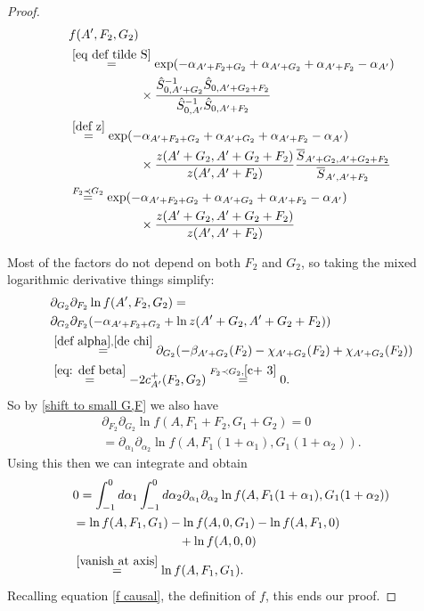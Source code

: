 \documentclass[b5paper,draft,openbib,12pt]{memoir}
\begin{document}
\begin{proof}
 \begin{align}\notag
 &f(A',F_2,G_2)\\\notag
 &\overset{\eqref{eq def tilde S}}{=}
 \exp(-\alpha_{A'+F_2+G_2}+\alpha_{A'+G_2}+\alpha_{A'+F_2}-\alpha_{A'})\\
 &\hspace{2cm}\times\frac{\hat{S}_{0,A'+G_2}^{-1}\hat{S}_{0,A'+G_2+F_2}}{\hat{S}_{0,A'}^{-1}\hat{S}_{0,A'+F_2}}
 \\\notag
 &\overset{\eqref{def z}}{=}
 \exp(-\alpha_{A'+F_2+G_2}+\alpha_{A'+G_2}+\alpha_{A'+F_2}-\alpha_{A'})\\
 &\hspace{2cm}\times \frac{z(A'+G_2,A'+G_2+F_2) }{z(A',A'+F_2)} \frac{\overline{S}_{A'+G_2,A'+G_2+F_2}}{\overline{S}_{A',A'+F_2}}\\\notag
 &\overset{F_2\prec G_2 }{=}\exp(-\alpha_{A'+F_2+G_2}+\alpha_{A'+G_2}+\alpha_{A'+F_2}-\alpha_{A'})\\
 &\hspace{2cm}\times \frac{z(A'+G_2,A'+G_2+F_2) }{z(A',A'+F_2)}
 \end{align}

Most of the factors do not depend on both \(F_2\) and 
\(G_2\), so taking the mixed logarithmic derivative things 
simplify:
\begin{align}\notag
&\partial_{G_2}\partial_{F_2} \ln f(A',F_2,G_2)= \\
&\partial_{G_2}\partial_{F_2} ( -\alpha_{A'+F_2+G_2} + \ln z(A'+G_2,A'+G_2+F_2))\\
&\overset{\eqref{def alpha}, \eqref{de chi}}{=}  \partial_{G_2} (-\beta_{A'+G_2}(F_2)-\chi_{A'+G_2}(F_2) + \chi_{A'+G_2}(F_2))\\
&\overset{\eqref{eq: def beta}}{=}-2 c^+_{A'}(F_2,G_2)\overset{F_2\prec G_2, \eqref{c+ 3}}{=}0.
\end{align}
So by \eqref{shift to small G,F} we also have
\begin{align}
\partial_{F_2}\partial_{G_2}\ln f(A,F_1+F_2,G_1+G_2)=0\\
=\partial_{\alpha_1}\partial_{\alpha_2}\ln f(A,F_1(1+\alpha_1),G_1(1+\alpha_2)).
\end{align}
Using this then we can integrate and obtain
\begin{align}
&0=\int_{-1}^0d \alpha_1 \int_{-1}^0d \alpha_2  \partial_{\alpha_1}\partial_{\alpha_2}\ln f(A,F_1(1+\alpha_1),G_1(1+\alpha_2))\\
&=\ln f(A,F_1,G_1)-\ln f(A,0,G_1)-\ln f(A,F_1,0)\\\notag 
&\hspace{3cm}+ \ln f(A,0,0)\\
&\overset{\eqref{vanish at axis}}{=}\ln f(A,F_1,G_1).
\end{align}
Recalling equation \eqref{f causal}, the definition of \(f\),  this ends our proof.
\end{proof}
\end{document}
